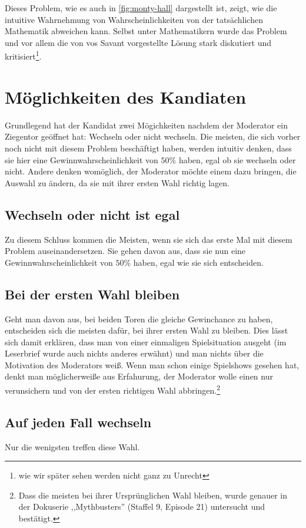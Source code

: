 Dieses Problem, wie es auch in \autoref{fig:monty-hall} dargestellt ist, zeigt, wie die intuitive Wahrnehmung von Wahrscheinlichkeiten von der tatsächlichen Mathematik abweichen kann. Selbst unter Mathematikern wurde das Problem und vor allem die von vos Savant vorgestellte Lösung stark diskutiert und kritisiert\footnote{wie wir später sehen werden nicht ganz zu Unrecht}.

\section{Möglichkeiten des Kandiaten}

Grundlegend hat der Kandidat zwei Mögichkeiten nachdem der Moderator ein Ziegentor geöffnet hat: Wechseln oder nicht wechseln. Die meisten, die sich vorher noch nicht mit diesem Problem beschäftigt haben, werden intuitiv denken, dass sie hier eine Gewinnwahrscheinlichkeit von $50\%$ haben, egal ob sie wechseln oder nicht. Andere denken womöglich, der Moderator möchte einem dazu bringen, die Auswahl zu ändern, da sie mit ihrer ersten Wahl richtig lagen.

\subsection{Wechseln oder nicht ist egal}

Zu diesem Schluss kommen die Meisten, wenn sie sich das erste Mal mit diesem Problem auseinandersetzen. Sie gehen davon aus, dass sie nun eine Gewinnwahrscheinlichkeit von $50\%$ haben, egal wie sie sich entscheiden.

\subsection{Bei der ersten Wahl bleiben}

Geht man davon aus, bei beiden Toren die gleiche Gewinchance zu haben, entscheiden sich die meisten dafür, bei ihrer ersten Wahl zu bleiben. Dies lässt sich damit erklären, dass man von einer einmaligen Spielsituation ausgeht (im Leserbrief wurde auch nichts anderes erwähnt) und man nichts über die Motivation des Moderators weiß. Wenn man schon einige Spielshows gesehen hat, denkt man möglicherweiße aus Erfahurung, der Moderator wolle einen nur verunsichern und von der ersten richtigen Wahl abbringen.\footnote{Dass die meisten bei ihrer Ursprünglichen Wahl bleiben, wurde genauer in der Dokuserie ,,Mythbusters'' (Staffel 9, Episode 21) untersucht und bestätigt.}

\subsection{Auf jeden Fall wechseln}

Nur die wenigsten treffen diese Wahl.


